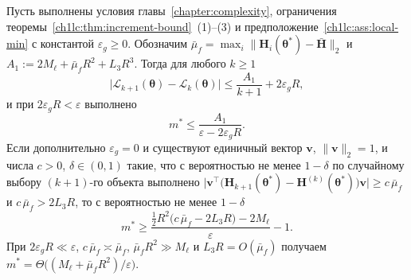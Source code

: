 \begin{theorem}\label{ch3:thm:two-sided-mstar}
Пусть выполнены условия главы~\ref{chapter:complexity}, ограничения теоремы~\ref{ch1lc:thm:increment-bound}~(1)--(3) и предположение~\ref{ch1lc:ass:local-min} с константой $\varepsilon_g\ge 0$. Обозначим $\bar\mu_f=\max_i\|\mathbf{H}_i(\boldsymbol{\theta}^*)-\bar{\mathbf{H}}\|_2$ и $A_1:=2M_\ell+\bar\mu_f R^2+L_3 R^3$. Тогда для любого $k\ge 1$
\begin{equation}\label{ch3:eq:mstar-incr}
  \bigl|\mathcal{L}_{k+1}(\boldsymbol{\theta})-\mathcal{L}_k(\boldsymbol{\theta})\bigr|
  \le\frac{A_1}{k+1}+2\varepsilon_gR,
\end{equation}
и при $2\varepsilon_gR<\varepsilon$ выполнено
\begin{equation}\label{ch3:eq:mstar-upper}
  m^*\le\frac{A_1}{\varepsilon-2\varepsilon_gR}.
\end{equation}
Если дополнительно $\varepsilon_g=0$ и существуют единичный вектор $\mathbf{v}$, $\|\mathbf{v}\|_2=1$, и числа $c>0$, $\delta\in(0,1)$ такие, что с вероятностью не менее $1-\delta$ по случайному выбору $(k+1)$-го объекта выполнено $\bigl|\mathbf{v}^{\top}\bigl(\mathbf{H}_{k+1}(\boldsymbol{\theta}^*)-\mathbf{H}^{(k)}(\boldsymbol{\theta}^*)\bigr)\mathbf{v}\bigr|\ge c\,\bar\mu_f$ и $c\,\bar\mu_f>2L_3R$, то с вероятностью не менее $1-\delta$
\begin{equation}\label{ch3:eq:mstar-lower}
  m^*\ge\frac{\tfrac12 R^2\bigl(c\,\bar\mu_f-2L_3R\bigr)-2M_\ell}{\varepsilon}-1 .
\end{equation}
При $2\varepsilon_gR\ll\varepsilon$, $c\,\bar\mu_f\asymp\bar\mu_f$, $\bar\mu_f R^2\gg M_\ell$ и $L_3R=O(\bar\mu_f)$ получаем $m^*=\Theta\bigl((M_\ell+\bar\mu_f R^2)/\varepsilon\bigr)$.
\end{theorem}

